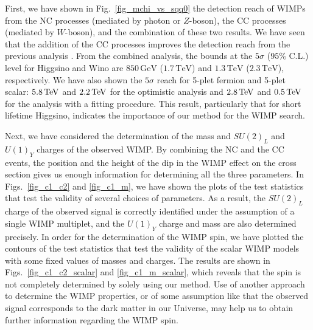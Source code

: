 \documentclass[12pt,twoside,book]{article}
\begin{document}
First, we have shown in Fig.~\ref{fig_mchi_vs_sqq0} the detection reach of WIMPs from the NC processes (mediated by photon or $Z$-boson), the CC processes (mediated by $W$-boson), and the combination of these two results.
We have seen that the addition of the CC processes improves the detection reach from the previous analysis \cite{Chigusa:2018vxz}.
From the combined analysis, the bounds at the $5\sigma$ ($95\%$ C.L.) level for Higgsino and Wino are $850\,\mathrm{GeV}$ ($1.7\,\mathrm{TeV}$) and $1.3\,\mathrm{TeV}$ ($2.3\,\mathrm{TeV}$), respectively.
We have also shown the $5\sigma$ reach for 5-plet fermion and 5-plet scalar: $5.8\,{\rm TeV}$ and $2.2\,{\rm TeV}$ for the optimistic analysis and $2.8\,{\rm TeV}$ and $0.5\,{\rm TeV}$ for the analysis with a fitting procedure.
This result, particularly that for short lifetime Higgsino, indicates the importance of our method for the WIMP search.

Next, we have considered the determination of the mass and $SU(2)_L$ and $U(1)_Y$ charges of the observed WIMP.
By combining the NC and the CC events, the position and the height of the dip in the WIMP effect on the cross section gives us enough information for determining all the three parameters.
In Figs.~\ref{fig_c1_c2} and \ref{fig_c1_m}, we have shown the plots of the test statistics that test the validity of several choices of parameters.
As a result, the $SU(2)_L$ charge of the observed signal is correctly identified under the assumption of a single WIMP multiplet, and the $U(1)_Y$ charge and mass are also determined precisely.
In order for the determination of the WIMP spin, we have plotted the contours of the test statistics that test the validity of the scalar WIMP models with some fixed values of masses and charges.
The results are shown in Figs.~\ref{fig_c1_c2_scalar} and \ref{fig_c1_m_scalar}, which reveals that the spin is not completely determined by solely using our method.
Use of another approach to determine the WIMP properties, or of some assumption like that the observed signal corresponds to the dark matter in our Universe, may help us to obtain further information regarding the WIMP spin.

% 
% 
\end{document}
